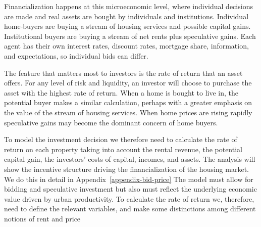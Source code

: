 



Financialization happens at this microeconomic level, where individual decisions are made and  real assets are bought by individuals and institutions. Individual home-buyers are buying a stream of housing services and possible capital gains. Institutional buyers are buying a stream of net rents plus speculative gains. Each agent has their own interest rates, discount rates, mortgage share, information, and expectations, so individual bids can differ.


The feature that matters most to investors is the  \gls{rate of return} that  an asset offers. For any level of risk and liquidity, an investor will choose to purchase the asset with the highest rate of return. When a home is bought to live in, the potential buyer makes a similar calculation, perhaps with a greater emphasis on the value of the stream of housing services. When home prices are rising rapidly speculative gains may become the dominant concern of home buyers. 

To model the investment decision  we therefore need to calculate the \gls{rate of return} on each property taking into account the rental revenue, the potential capital gain, the investors' costs of capital, incomes, and assets. The analysis will show the incentive structure driving the  financialization of the housing market. We do this in detail in Appendix~\ref{appendix-bid-price} 
The model must  allow for bidding and speculative investment but also must reflect the underlying economic value driven by urban productivity. To calculate the \gls{rate of return} we, therefore, need to define  the relevant variables, and make some distinctions among different notions  of rent and price %
